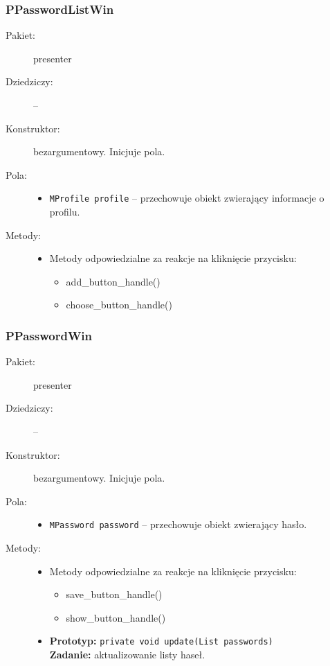 \documentclass[a4paper]{article}
\newcommand{\prog}{\texttt}
\begin{document}
\subsubsection{PPasswordListWin}
\begin{description}
    \item[Pakiet:] presenter
    \item[Dziedziczy:] --
    \item[Konstruktor:] bezargumentowy. Inicjuje pola.
    \item[Pola:] \hfill
    \begin{itemize}
        \item \prog{MProfile profile} -- przechowuje obiekt zwierający informacje o profilu.
    \end{itemize}
    \item[Metody:] \hfill
    \begin{itemize}
        \item Metody odpowiedzialne za reakcje na kliknięcie przycisku:
        \begin{itemize}
            \item add\_button\_handle()
            \item choose\_button\_handle()
        \end{itemize}
    \end{itemize}
\end{description}

\subsubsection{PPasswordWin}
\begin{description}
    \item[Pakiet:] presenter
    \item[Dziedziczy:] --
    \item[Konstruktor:] bezargumentowy. Inicjuje pola.
    \item[Pola:] \hfill
    \begin{itemize}
        \item \prog{MPassword password} -- przechowuje obiekt zwierający hasło.
    \end{itemize}
    \item[Metody:] \hfill
    \begin{itemize}
        \item Metody odpowiedzialne za reakcje na kliknięcie przycisku:
        \begin{itemize}
            \item save\_button\_handle()
            \item show\_button\_handle()
        \end{itemize}
        \item \textbf{Prototyp:} \prog{private void update(List passwords)}\\\textbf{Zadanie:} aktualizowanie listy haseł.
    \end{itemize}
\end{description}
\end{document}
